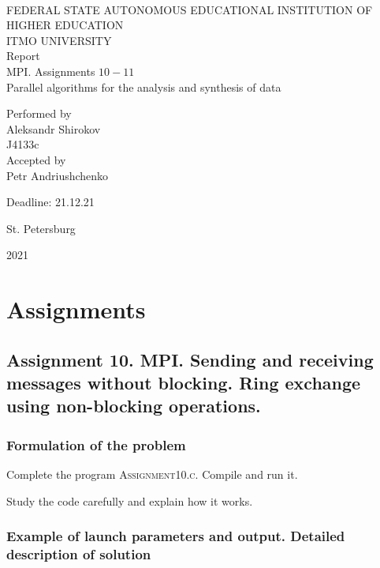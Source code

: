\documentclass[%
12pt, %
final, %
oneside, %
onecolumn, %
centertags]{article} %
\theoremstyle{plain}
\theoremstyle{definition}
\theoremstyle{remark}
\begin{document}
	\begin{titlepage} 
		\begin{center}
		\textbf{}\\[2.0cm]
		\LARGE FEDERAL STATE AUTONOMOUS EDUCATIONAL INSTITUTION OF HIGHER EDUCATION \\[0.5cm]
		\Large ITMO UNIVERSITY \\[3cm]
		\LARGE Report\\
		\Large MPI. Assignments $10-11$ \\
		\Large Parallel algorithms for the analysis and synthesis of data \\[4cm]


		\begin{flushright}
		Performed by\\
		Aleksandr Shirokov\\
		J4133c\\
		Accepted by\\
		Petr Andriushchenko

		Deadline: 21.12.21
		\end{flushright}

		\vfill 

		{\Large {St. Petersburg}} \par
		{\Large {2021}}
		\end{center} 
	\end{titlepage}

\tableofcontents
\newpage


\section{Assignments}

\subsection{Assignment 10. MPI. Sending and receiving messages without blocking. Ring exchange using non-blocking operations.}

\subsubsection{Formulation of the problem}

Complete the program \textsc{Assignment10.c.} Compile and run it.

Study the code carefully and explain how it works.

\subsubsection{Example of launch parameters and output. Detailed description of solution}
\end{document}
